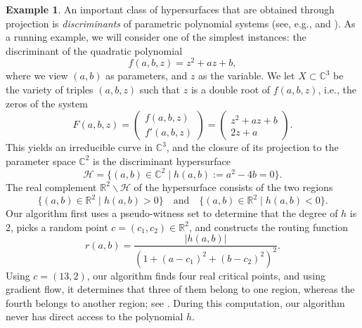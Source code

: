 \documentclass[11pt]{article}
\numberwithin{equation}{section}
\theoremstyle{plain}
\theoremstyle{definition}
\newtheorem{example}[theorem]{Example}
\theoremstyle{remark}
\newcommand{\sH}{{\mathcal H}}
\newcommand\bC{{\mathbb C}}
\newcommand\bR{{\mathbb R}}
\newcommand\suchthat{ \mid }
\begin{document}
\begin{example}\label{ex:quadratic_discriminant}
An important class of hypersurfaces that are obtained through projection is \emph{discriminants} of parametric polynomial systems (see, e.g., \cite{gkz1994} and ). As a running example, we will consider one of the simplest instances: the discriminant of the quadratic polynomial 
\begin{equation*}
f(a,b,z) = z^2 + az + b,  
\end{equation*}
where we view $(a,b)$ as parameters, and $z$ as the variable. We let $X\subset\bC^3$ be the variety of triples $(a,b,z)$ such that $z$ is a double root of $f(a,b,z)$, i.e., the zeros of the system 
\begin{equation}\label{eq:QuadDisc1}
F(a,b,z) = 
\begin{pmatrix}
f(a,b,z) \\[0.5ex] f'(a,b,z)
\end{pmatrix}
= 
\begin{pmatrix}
z^{2} + az + b \\[0.5ex] 2z + a
\end{pmatrix}.
\end{equation}
This yields an irreducible curve in $\bC^3$, and the closure of its projection to the parameter space $\mathbb C^2$ is the discriminant hypersurface
\begin{equation}\label{eq:QuadDisc}
\sH = \bigl\{(a,b)\in\bC^2\suchthat h(a,b):=a^2 - 4b=0\bigr\}.
\end{equation}
The real complement $\bR^{2}\smallsetminus \sH$ of the hypersurface consists of the two regions 
\begin{equation*}
\{(a,b) \in \bR^{2}  \mid h(a,b) >0\} \quad \text{and} \quad \{(a,b) \in \bR^{2} \mid h(a,b)<0\}. 
\end{equation*}
Our algorithm first uses a pseudo-witness set to determine that the degree of $h$ is $2$, picks a random point $c = (c_{1},c_{2})\in\bR^2$, and constructs the routing function
$$r(a,b) = \frac{\vert h(a,b)\vert }{(1+ (a-c_1)^2+(b-c_2)^2)^2}.$$ 
Using $c=(13,2)$, our algorithm finds four real critical points, and using gradient flow, it determines that three of them belong to one region, whereas the fourth belongs to another region; see . During this computation, our algorithm never has direct access to the polynomial $h$. 
\end{example}
\end{document}
